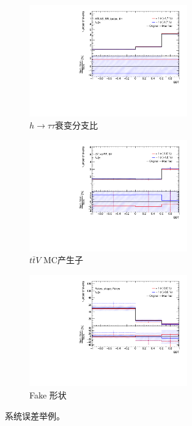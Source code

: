 \begin{figure}[htbp]
\centering
\begin{center}
\begin{subfigure}[b]{0.33\textwidth}
  \includegraphics[width=0.75\textwidth, angle=-90, keepaspectratio]{fig/h1l2tau_ttH.pdf}
  \caption{$h\rightarrow \tau\tau$衰变分支比}
\end{subfigure}
\begin{subfigure}[b]{0.33\textwidth}
  \includegraphics[width=0.75\textwidth, angle=-90, keepaspectratio]{fig/OneLepTwoTaus/Plots_ttV-signal_MCsys.pdf}
  \caption{$t\bar{t}V$ MC产生子}
\end{subfigure}
\begin{subfigure}[b]{0.33\textwidth}
  \includegraphics[width=0.75\textwidth, angle=-90, keepaspectratio]{fig/OneLepTwoTaus/h1l2tau_Fakes.pdf}
  \caption{Fake \tauhad 形状}
\end{subfigure}
\end{center}
\caption{系统误差举例。}
\label{Fig:1l2tau.shapesys}
\end{figure}
